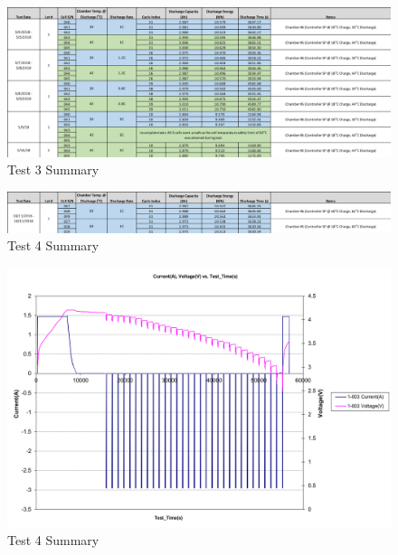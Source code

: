 \documentclass[]{aiaa-tc}%
\begin{document}
\begin{figure}[!htb]
	\centering
	\includegraphics[width=1.0\textwidth]{figures/Test3Summary.png}
	\caption{Test 3 Summary}
	\label{fig:Test3Summary}
\end{figure}

\begin{figure}[!htb]
	\centering
	\includegraphics[width=1.0\textwidth]{figures/Test4Summary.png}
	\caption{Test 4 Summary}
	\label{fig:Test4Summary}
\end{figure}

\begin{figure}[!htb]
	\centering
	\includegraphics[width=1.0\textwidth]{figures/SampleTest.png}
	\caption{Test 4 Summary}
	\label{fig:Test4Summary}
\end{figure}
\end{document}
